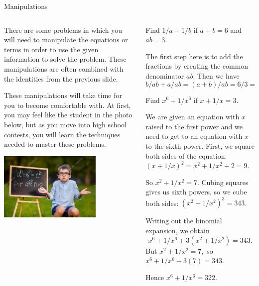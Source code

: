 \documentclass[9pt,aspectratio=169]{beamer}
\begin{document}
\begin{frame}{Manipulations}
  \begin{columns}[T]
    \begin{column}{0.5\textwidth}
      There are some problems in which you will need to manipulate the equations or terms in order to use the given information to solve the problem.  These manipulations are often combined with the identities from the previous slide.

      \medskip
      These manipulations will take time for you to become comfortable with.  At first, you may feel like the student in the photo below, but as you move into high school contests, you will learn the techniques needed to master these problems.

      \begin{center}
        \includegraphics[width=0.7\textwidth]{15 - Binomials/confussed.png}
      \end{center}
    \end{column}
    \begin{column}{0.5\textwidth}
      \begin{problem}
        Find $1/a + 1/b$ if $a + b = 6$ and $ab = 3$.        
      \end{problem}
      The first step here is to add the fractions by creating the common denominator $ab$.  Then we have \[b/ab + a/ab = (a + b)/ab = 6/3 = 2.\]
      \vspace*{-0.7\intextsep}
      \begin{problem}
        Find $x^6 + 1/x^6$ if $x + 1/x = 3$.
      \end{problem}

      We are given an equation with $x$ raised to the first power and we need to get to an equation with $x$ to the sixth power.  First, we square both sides of the equation: 
      $(x + 1/x)^2 = x^2 + 1/x^2 + 2  = 9.$

      So  $x^2 + 1/x^2 = 7$.  
      Cubing squares gives us sixth powers, so we cube both sides:  
      $(x^2 + 1/x^2)^3 = 343.$
      
      Writing out the binomial expansion, we obtain 
      \[x^6 + 1/x^6 + 3(x^2 + 1/x^2) = 343.\]  
      But $x^2 + 1/x^2 = 7,$ so $x^6 + 1/x^6 + 3(7) = 343.$  
      
      Hence $x^6 + 1/x^6 = 322.$

    \end{column}
  \end{columns}
\end{frame}
\end{document}
